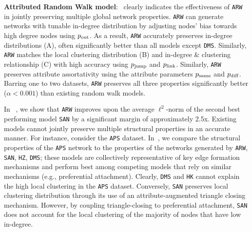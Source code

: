 \textbf{Attributed Random Walk model}:~ clearly indicates the effectiveness
of \texttt{ARW} in {jointly} preserving multiple
global network properties. \texttt{ARW} can generate networks with tunable
in-degree distribution by adjusting nodes' bias towards high degree nodes
using $p_{\scriptsize\mbox{out}}$. As a result, \texttt{ARW} accurately preserves
in-degree distributions (A), often significantly better
than all models except \texttt{DMS}. Similarly, \texttt{ARW} matches the local clustering
distribution  (B) and in-degree \& clustering relationship
(C) with high accuracy using $p_{\scriptsize\mbox{jump}}$ and
$p_{\scriptsize\mbox{link}}$. Similarly, \texttt{ARW} preserves attribute assortativity using
the attribute parameters $p_{\scriptsize\mbox{same}}$ and $p_{\scriptsize\mbox{diff}}$.
Barring one to two datasets, \texttt{ARW} preserves all three properties significantly
better ($\alpha < 0.001$) than existing random walk models.


In ~, we show that \texttt{ARW} improves upon the average $\ell^2$-norm
of the second best performing model \texttt{SAN} by a significant margin of approximately 2.5x.
Existing models cannot jointly preserve multiple structural properties in
an accurate manner. For instance, consider the \texttt{APS} dataset. In~,
we compare the structural properties of the \texttt{APS} network to the properties of the networks
generated by \texttt{ARW}, \texttt{SAN}, \texttt{HZ}, \texttt{DMS}; these models are collectively
representative of key edge formation mechanisms and perform best among competing models that rely on
similar mechanisms (e.g., preferential attachment). Clearly, \texttt{DMS} and \texttt{HK}
cannot explain the high local clustering in the \texttt{APS} dataset.
Conversely, \texttt{SAN} preserves local clustering distribution through its use of an attribute-augmented
triangle closing mechanism. However, by coupling triangle-closing to preferential attachment, \texttt{SAN} does not account
for the local clustering of the majority of nodes that have low in-degree.



